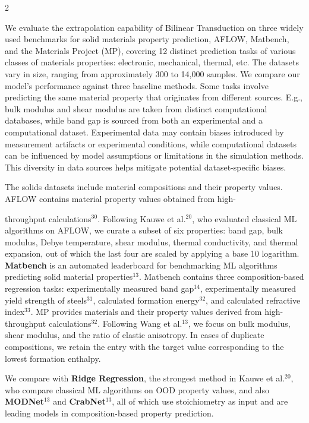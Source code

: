 \documentclass[10pt]{article}
\begin{document}
\begin{multicols}{2}
{We evaluate the extrapolation capability of Bilinear Transduction on three widely used benchmarks for solid materials property prediction, AFLOW, Matbench, and the Materials Project (MP), covering 12 distinct prediction tasks of various classes of materials properties: electronic, mechanical, thermal, etc. The datasets vary in size, ranging from approximately 300 to 14,000 samples. We compare our model's performance against three baseline methods. Some tasks involve predicting the same material property that originates from different sources. E.g., bulk modulus and shear modulus are taken from distinct computational databases, while band gap is sourced from both an experimental and a computational dataset. Experimental data may contain biases introduced by measurement artifacts or experimental conditions, while computational datasets can be influenced by model assumptions or limitations in the simulation methods. This diversity in data sources helps mitigate potential dataset-specific biases.

The solids datasets include material compositions and their property values. AFLOW contains material property values obtained from high-

throughput calculations$^{30}$. Following Kauwe et al.$^{20}$, who evaluated classical ML algorithms on AFLOW, we curate a subset of six properties: band gap, bulk modulus, Debye temperature, shear modulus, thermal conductivity, and thermal expansion, out of which the last four are scaled by applying a base 10 logarithm. \textbf{Matbench} is an automated leaderboard for benchmarking ML algorithms predicting solid material properties$^{13}$. Matbench contains three composition-based regression tasks: experimentally measured band gap$^{14}$, experimentally measured yield strength of steels$^{31}$, calculated formation energy$^{32}$, and calculated refractive index$^{33}$. MP provides materials and their property values derived from high-throughput calculations$^{32}$. Following Wang et al.$^{13}$, we focus on bulk modulus, shear modulus, and the ratio of elastic anisotropy. In cases of duplicate compositions, we retain the entry with the target value corresponding to the lowest formation enthalpy.

We compare with \textbf{Ridge Regression}, the strongest method in Kauwe et al.$^{20}$, who compare classical ML algorithms on OOD property values, and also \textbf{MODNet}$^{13}$ and \textbf{CrabNet}$^{13}$, all of which use stoichiometry as input and are leading models in composition-based property prediction.

}
\end{multicols}
\end{document}
